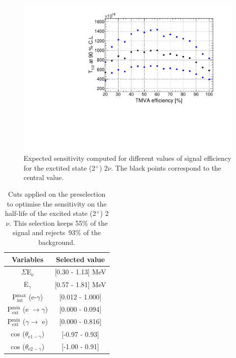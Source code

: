 \documentclass[main.tex]{subfiles}
\begin{document}
\begin{figure} [h!]
\begin{center}
\includegraphics[scale=0.5]{pictures/FinalResults/bb2nu2/150/SensVsEffbb2nu_2_150keV.pdf}
\end{center}
\caption{Expected sensitivity computed for different values of signal efficiency for the exctited state (2$^+$) 2$\nu$. The black points correspond to the central value.}
\label{plot:SensVsEff_150}
\end{figure}


\begin{table}[h!]
\centering
\begin{tabular}{c|c}
Variables & Selected value \\
\toprule
$\Sigma$E$_{\text{e}}$ & [0.30 - 1.13] MeV \\
E$_{\gamma}$    & [0.57 - 1.81] MeV \\
P$_{\text{int}}^{\text{max}}$ (e-$\gamma$) & [0.012 - 1.000] \\
P$_{\text{ext}}^{\text{min}}$ (e $\rightarrow \gamma$) & [0.000 - 0.094] \\
P$_{\text{ext}}^{\text{min}}$ ($\gamma \rightarrow$ e) & [0.000 - 0.816] \\
cos ($\theta_{\text{e1}-\gamma}$) & [-0.97 - 0.93] \\
cos ($\theta_{\text{e2}-\gamma}$) & [-1.00 - 0.91] \\
\bottomrule
\end{tabular}
\caption{Cuts applied on the preselection to optimise the sensitivity on the half-life of the excited state (2$^+$) 2$\nu$. This selection keeps 55\% of the signal and rejects~93\% of the background.}
\label{tab:Cuts2nu2Plus150keV}
\end{table}
\end{document}
